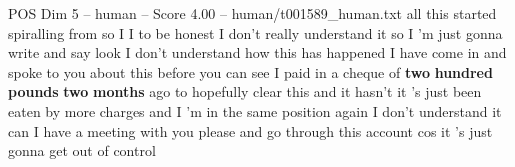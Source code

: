 \begin{textsample}{POS Dim 5 – human – Score 4.00 – human/t001589\_human.txt}  \label{ex:f5_pos_015}
all this started spiralling from so I I to be honest I don't really understand it so I 'm just gonna write and say look I don't understand how this has happened I have come in and spoke to you about this before you can see I paid in a cheque of \textbf{two} \textbf{hundred} \textbf{pounds} \textbf{two} \textbf{months} ago to hopefully clear this and it hasn't it 's just been eaten by more charges and I 'm in the same position again I don't understand it can I have a meeting with you please and go through this account cos it 's just gonna get out of control

\end{textsample}
